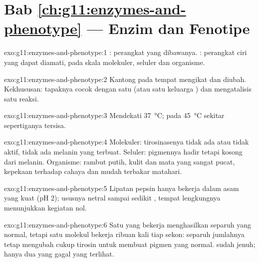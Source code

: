 \section*{Bab \ref{ch:g11:enzymes-and-phenotype} --- Enzim dan Fenotipe}

\begin{solution}{exo:g11:enzymes-and-phenotype:1}
: perangkat  yang dibawanya. : perangkat ciri yang
dapat diamati, pada skala molekuler, seluler dan organisme.
\end{solution}

\begin{solution}{exo:g11:enzymes-and-phenotype:2}
Kantong pada  tempat  mengikat dan diubah.
Kekhususan: tapaknya cocok dengan satu  (atau satu keluarga
) dan mengatalisis satu reaksi.
\end{solution}

\begin{solution}{exo:g11:enzymes-and-phenotype:3}
Mendekati \qty{37}{\celsius}; pada \qty{45}{\celsius} sekitar sepertiganya tersisa.
\end{solution}

\begin{solution}{exo:g11:enzymes-and-phenotype:4}
Molekuler: tirosinasenya tidak ada atau tidak aktif, tidak ada melanin
yang terbuat. Seluler:  pigmennya hadir tetapi kosong dari melanin.
Organisme: rambut putih, kulit dan mata yang sangat pucat, kepekaan
terhadap cahaya dan mudah terbakar matahari.
\end{solution}

\begin{solution}{exo:g11:enzymes-and-phenotype:5}
Lipatan pepsin hanya bekerja dalam asam yang kuat (pH 2); ususnya
netral sampai sedikit , tempat lengkungnya menunjukkan kegiatan nol.
\end{solution}

\begin{solution}{exo:g11:enzymes-and-phenotype:6}
Satu  yang bekerja menghasilkan separuh  yang normal, tetapi
satu molekul  bekerja ribuan kali tiap sekon: separuh jumlahnya
tetap mengubah cukup tirosin untuk membuat pigmen yang normal.
 sudah jenuh; hanya dua  yang gagal yang terlihat.
\end{solution}

